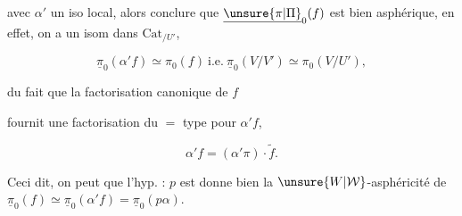 

avec $\alpha'$  un iso local, alors   conclure que $\underline{\unsure{\pi|\Pi}}_0(f)$ est bien asphérique,  en effet, on a un isom  dans $\mathrm{Cat}_{/U'}$,

\[
\underline{\pi}_0(\alpha'f)\simeq\pi_0(f)\ \text{i.e.}\ \underline{\pi}_0(V/V')\simeq\pi_0(V/U'),
\]

du fait  que la factorisation canonique de $f$


fournit une factorisation du $=$ type pour $\alpha'f$, 

\[
\alpha'f=(\alpha'\pi)\cdot\widetilde f.
\]

Ceci dit, on peut  que l'hyp. : $p$ est  donne bien la $\unsure{W|\mathcal W}$-asphéricité de $\underline{\pi}_0(f)\simeq\underline{\pi}_0(\alpha'f)=\underline{\pi}_0(p\alpha)$.
